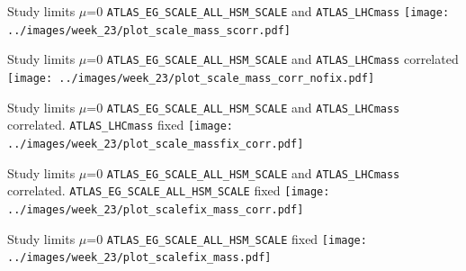 \documentclass[10pt,UKenglish, leqno, xcolor = dvipsnames]{beamer}
\begin{document}
		\begin{frame}{Study limits $\mu$=0}
			\vfill
			\texttt{ATLAS\_EG\_SCALE\_ALL\_HSM\_SCALE} and \texttt{ATLAS\_LHCmass}
			\centering
			\texttt{[image: ../images/week\_23/plot\_scale\_mass\_scorr.pdf]}
			\vfill
		\end{frame}
	
		\begin{frame}{Study limits $\mu$=0}
			\vfill
			\texttt{ATLAS\_EG\_SCALE\_ALL\_HSM\_SCALE} and \texttt{ATLAS\_LHCmass} correlated
			\centering
			\texttt{[image: ../images/week\_23/plot\_scale\_mass\_corr\_nofix.pdf]}
			\vfill
		\end{frame}
	
		\begin{frame}{Study limits $\mu$=0}
			\vfill
			\texttt{ATLAS\_EG\_SCALE\_ALL\_HSM\_SCALE} and \texttt{ATLAS\_LHCmass} correlated. \texttt{ATLAS\_LHCmass} fixed
			\centering
			\texttt{[image: ../images/week\_23/plot\_scale\_massfix\_corr.pdf]}
			\vfill
		\end{frame}
		
		\begin{frame}{Study limits $\mu$=0}
			\vfill
			\texttt{ATLAS\_EG\_SCALE\_ALL\_HSM\_SCALE} and \texttt{ATLAS\_LHCmass} correlated. \texttt{ATLAS\_EG\_SCALE\_ALL\_HSM\_SCALE} fixed
			\centering
			\texttt{[image: ../images/week\_23/plot\_scalefix\_mass\_corr.pdf]}
			\vfill
		\end{frame}
	
		\begin{frame}{Study limits $\mu$=0}
			\vfill
			\texttt{ATLAS\_EG\_SCALE\_ALL\_HSM\_SCALE} fixed
			\centering
			\texttt{[image: ../images/week\_23/plot\_scalefix\_mass.pdf]}
			\vfill
		\end{frame}
\end{document}
